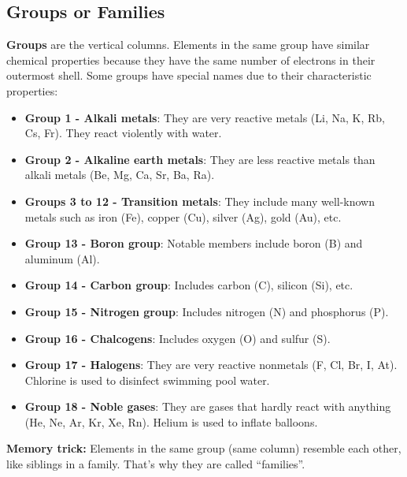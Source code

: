 \subsection{Groups or Families}
\textbf{Groups} are the vertical columns. Elements in the same group have similar chemical properties because they have the same number of electrons in their outermost shell.
Some groups have special names due to their characteristic properties:
\begin{itemize}
    \item \textbf{Group 1 - Alkali metals}: They are very reactive metals (Li, Na, K, Rb, Cs, Fr). They react violently with water.
    \item \textbf{Group 2 - Alkaline earth metals}: They are less reactive metals than alkali metals (Be, Mg, Ca, Sr, Ba, Ra).
    \item \textbf{Groups 3 to 12 - Transition metals}: They include many well-known metals such as iron (Fe), copper (Cu), silver (Ag), gold (Au), etc.
    \item \textbf{Group 13 - Boron group}: Notable members include boron (B) and aluminum (Al).
    \item \textbf{Group 14 - Carbon group}: Includes carbon (C), silicon (Si), etc.
    \item \textbf{Group 15 - Nitrogen group}: Includes nitrogen (N) and phosphorus (P).
    \item \textbf{Group 16 - Chalcogens}: Includes oxygen (O) and sulfur (S).
    \item \textbf{Group 17 - Halogens}: They are very reactive nonmetals (F, Cl, Br, I, At). Chlorine is used to disinfect swimming pool water.
    \item \textbf{Group 18 - Noble gases}: They are gases that hardly react with anything (He, Ne, Ar, Kr, Xe, Rn). Helium is used to inflate balloons.
\end{itemize}
\begin{remark}
    \textbf{Memory trick:} Elements in the same group (same column) resemble each other, like siblings in a family. That's why they are called ``families''.
\end{remark}
